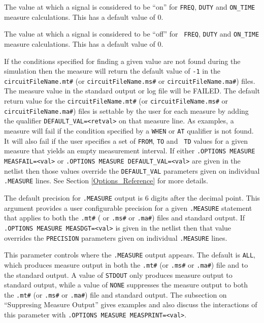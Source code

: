 \begin{Command}
\begin{Arguments}

The value at which a signal is considered to be ``on'' for {\tt FREQ},
{\tt DUTY} and {\tt ON\_TIME} measure calculations.  This has a
default value of 0.


The value at which a signal is considered to be ``off'' for {\tt
FREQ}, {\tt DUTY} and {\tt ON\_TIME} measure calculations.  This has a
default value of 0.


If the conditions specified for finding a given value are not found
during the simulation then the measure will return the default value
of {\tt -1} in the \texttt{circuitFileName.mt\#}
(or \texttt{circuitFileName.ms\#} or \texttt{circuitFileName.ma\#})
files.  The measure value in the standard output or log file will be
FAILED.  The default return value for
the \texttt{circuitFileName.mt\#} (or \texttt{circuitFileName.ms\#}
or \texttt{circuitFileName.ma\#}) files is settable by the user for
each measure by adding the qualifier {\tt DEFAULT\_VAL=<retval>} on
that measure line.  As examples, a measure will fail if the condition
specified by a {\tt WHEN} or {\tt AT} qualifier is not found.  It will
also fail if the user specifies a set of {\tt FROM}, {\tt TO} and {\tt
TD} values for a given measure that yields an empty measurement
interval.  If either \texttt{.OPTIONS MEASURE MEASFAIL=<val>}
or \texttt{.OPTIONS MEASURE DEFAULT\_VAL=<val>} are given in the
netlist then those values override the \texttt{DEFAULT\_VAL}
parameters given on individual
\texttt{.MEASURE} lines.  See Section \ref{Options_Reference} for more details.


The default precision for {\tt .MEASURE} output is 6 digits after the
decimal point.  This argument provides a user configurable precision
for a given {\tt .MEASURE} statement that applies to both
the \texttt{.mt\#} ( or \texttt{.ms\#} or \texttt{.ma\#}) files and
standard output.  If \texttt{.OPTIONS MEASURE MEASDGT=<val>} is given
in the netlist then that value overrides the \texttt{PRECISION}
parameters given on individual \texttt{.MEASURE} lines.


This parameter controls where the {\tt .MEASURE} output appears.  The
default is {\tt ALL}, which produces measure output in both
the \texttt{.mt\#} (or \texttt{.ms\#} or
\texttt{.ma\#}) file and to the standard output.  A value of
{\tt STDOUT} only produces measure output to standard output, while a
value of {\tt NONE} suppresses the measure output to both
the \texttt{.mt\#} (or \texttt{.ms\#} or \texttt{.ma\#}) file and
standard output.  The subsection on ``Suppresing Measure Output''
gives examples and also discuss the interactions of this parameter
with \texttt{.OPTIONS MEASURE MEASPRINT=<val>}.


\end{Arguments}
\end{Command}
